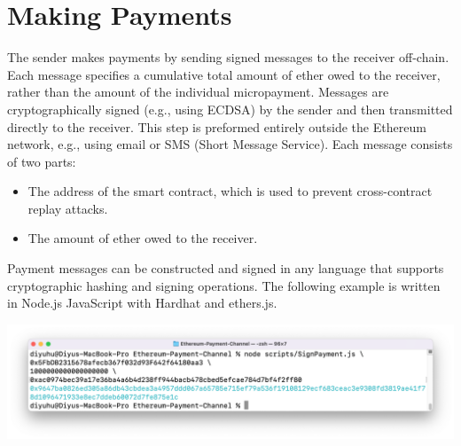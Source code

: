 \section{Making Payments}\label{sec:making-payments}
The sender makes payments by sending signed messages to the receiver off-chain.
Each message specifies a cumulative total amount of ether owed to the receiver, rather than the amount of the individual
micropayment.
Messages are cryptographically signed (e.g., using ECDSA) by the sender and then transmitted directly to the receiver.
This step is preformed entirely outside the Ethereum network, e.g., using email or SMS (Short Message Service).
Each message consists of two parts:

\begin{itemize}
    \item The address of the smart contract, which is used to prevent cross-contract replay attacks.
    \item The amount of ether owed to the receiver.
\end{itemize}

Payment messages can be constructed and signed in any language that supports cryptographic hashing and signing
operations.
The following example is written in Node.js JavaScript with Hardhat and ethers.js.



\includegraphics[width=\textwidth]{./images/sign-message-example}